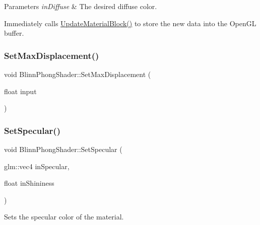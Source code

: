 \begin{DoxyParams}{Parameters}
{\em in\+Diffuse} & The desired diffuse color.\\
\hline
\end{DoxyParams}
Immediately calls \hyperlink{class_blinn_phong_shader_aa247270120b46431b436220ea6e777be}{Update\+Material\+Block()} to store the new data into the Open\+GL buffer. \hypertarget{class_blinn_phong_shader_acbef23fe1f5ea72a10dc6ded656dacf0}{}\label{class_blinn_phong_shader_acbef23fe1f5ea72a10dc6ded656dacf0} 
\subsubsection{\texorpdfstring{Set\+Max\+Displacement()}{SetMaxDisplacement()}}
{\footnotesize\ttfamily void Blinn\+Phong\+Shader\+::\+Set\+Max\+Displacement (\begin{DoxyParamCaption}\item[{float}]{input }\end{DoxyParamCaption})\hspace{0.3cm}{\ttfamily [virtual]}}

\hypertarget{class_blinn_phong_shader_a6567423da36050cc1567919707e8be72}{}\label{class_blinn_phong_shader_a6567423da36050cc1567919707e8be72} 
\subsubsection{\texorpdfstring{Set\+Specular()}{SetSpecular()}}
{\footnotesize\ttfamily void Blinn\+Phong\+Shader\+::\+Set\+Specular (\begin{DoxyParamCaption}\item[{glm\+::vec4}]{in\+Specular,  }\item[{float}]{in\+Shininess }\end{DoxyParamCaption})\hspace{0.3cm}{\ttfamily [virtual]}}



Sets the specular color of the material. 


